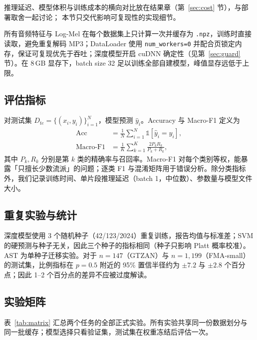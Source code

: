 \documentclass[UTF8,10pt,a4paper]{ctexart}
\begin{document}
推理延迟、模型体积与训练成本的横向对比放在结果章（第~\ref{sec:cost} 节），与部署取舍一起讨论；
本节只交代影响可复现性的实现细节。

所有音频特征与 Log-Mel 在每个数据集上只计算一次并缓存为 \texttt{.npz}，训练时直接读取，避免重复解码 MP3；DataLoader 使用 \texttt{num\_workers=0} 并配合页锁定内存，保证可复现优先于吞吐；深度模型开启 cuDNN 确定性（见第~\ref{sec:guard} 节）。在 8\,GB 显存下，batch size 32 足以训练全部自建模型，峰值显存远低于上限。


\subsection{评估指标}

对测试集 $D_{te}=\{(x_i,y_i)\}_{i=1}^{N}$，模型预测 $\hat y_i$。Accuracy 与 Macro-F1 定义为
\begin{align}
  \mathrm{Acc} &= \frac{1}{N}\sum_{i=1}^{N}\mathbb{1}[\hat y_i=y_i],\\
  \mathrm{Macro\text{-}F1} &= \frac{1}{K}\sum_{k=1}^{K}
  \frac{2P_kR_k}{P_k+R_k},
\end{align}
其中 $P_k,R_k$ 分别是第 $k$ 类的精确率与召回率。Macro-F1 对每个类别等权，能暴露「只擅长少数流派」的问题；逐类 F1 与混淆矩阵用于错误分析。除分类指标外，我们记录训练时间、单片段推理延迟（batch 1，中位数）、参数量与模型文件大小。

\subsection{重复实验与统计}

深度模型使用 3 个随机种子（42/123/2024）重复训练，报告均值与标准差；SVM 的硬预测与种子无关，因此三个种子的指标相同（种子只影响 Platt 概率校准）。AST 为单种子迁移实验。对于 $n=147$（GTZAN）与 $n=1{,}199$（FMA-small）的测试集，比例指标在 $p=0.5$ 附近的 95\% 置信半径约为 $\pm 7.2$ 与 $\pm 2.8$ 个百分点；因此 1--2 个百分点的差异不应被过度解读。

\subsection{实验矩阵}

表~\ref{tab:matrix} 汇总两个任务的全部正式实验。所有实验共享同一份数据划分与同一批缓存；模型选择只看验证集，测试集在权重冻结后评估一次。
\end{document}
